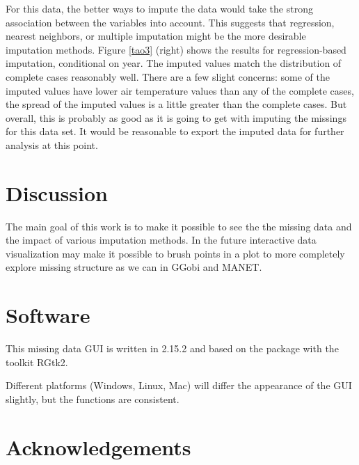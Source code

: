 \documentclass[article]{jss}
\begin{document}
For this data, the better ways to impute the data would take the strong association between the variables into account. This suggests that regression, nearest neighbors, or multiple imputation might be the more desirable imputation methods. Figure \ref{tao3} (right) shows the results for regression-based imputation, conditional on year. The imputed values match the distribution of complete cases reasonably well. There are a few slight concerns: some of the imputed values have lower air temperature values than any of the complete cases, the spread of the imputed values is a little greater than the complete cases. But overall, this is probably as good as it is going to get with imputing the missings for this data set. It would be reasonable to export the imputed data for further analysis at this point.


\section{Discussion}

The main goal of this work is to make it possible to see the the missing data and the impact of various imputation methods. In the future interactive data visualization may make it possible to brush points in a plot to more completely explore missing structure as we can in GGobi and MANET.


\section*{Software}

This missing data GUI is written in  2.15.2 \citep{r} and
based on the package  \citep{gwidgets} with the toolkit
RGtk2. 

Different platforms (Windows, Linux, Mac) will differ the appearance of the GUI slightly, but the functions are consistent.

\section*{Acknowledgements}
\end{document}
